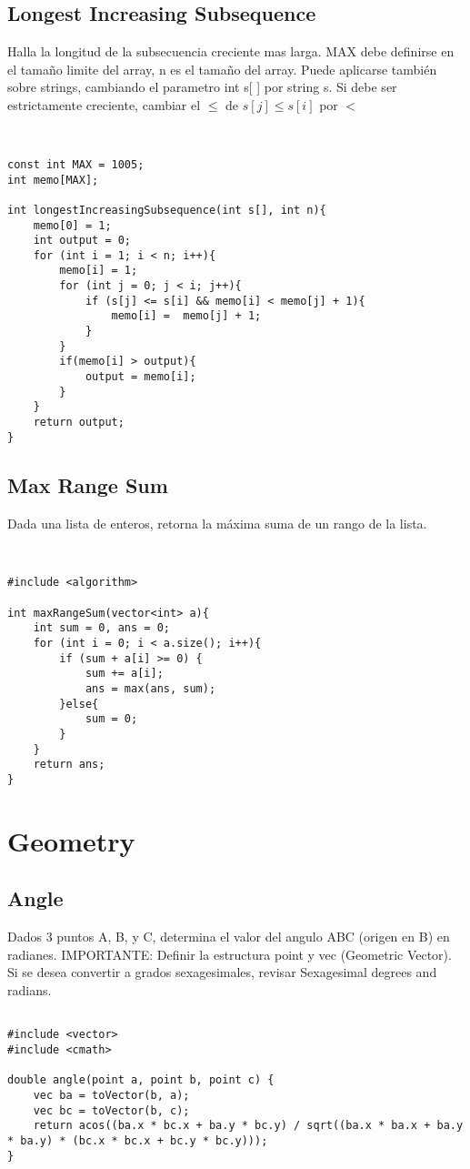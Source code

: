 \documentclass[11pt,letterpaper,twocolumn,twosided]{article}
\begin{document}
\subsection{Longest Increasing Subsequence}
Halla la longitud de la subsecuencia creciente mas larga. MAX debe definirse en el tama\~no  limite del array, n es el tama\~no del array. Puede aplicarse tambi\'en sobre strings, cambiando el parametro int s[ ] por string s. Si debe ser estrictamente creciente, cambiar el $\leq$ de $s[ j ] \leq s[i]$ por $<$
\begin{lstlisting}


const int MAX = 1005;
int memo[MAX];

int longestIncreasingSubsequence(int s[], int n){
	memo[0] = 1;
	int output = 0;
	for (int i = 1; i < n; i++){
		memo[i] = 1;
		for (int j = 0; j < i; j++){
			if (s[j] <= s[i] && memo[i] < memo[j] + 1){
				memo[i] =  memo[j] + 1;
			} 
		}
		if(memo[i] > output){
			output = memo[i];
		}
	}
	return output;
}
\end{lstlisting}

\subsection{Max Range Sum}
Dada una lista de enteros, retorna la máxima suma de un rango de la lista.
\begin{lstlisting}


#include <algorithm>

int maxRangeSum(vector<int> a){
	int sum = 0, ans = 0;
	for (int i = 0; i < a.size(); i++){
		if (sum + a[i] >= 0) {  
			sum += a[i];
		    ans = max(ans, sum);          
	    }else{
	    	sum = 0;
	    }
	}
	return ans;
}
\end{lstlisting}

\section{Geometry}

\subsection{Angle}
Dados 3 puntos A, B, y C, determina el valor del angulo ABC (origen en B) en radianes. IMPORTANTE: Definir la estructura point y vec (Geometric Vector). Si se desea convertir a grados sexagesimales, revisar Sexagesimal degrees and radians.

\begin{lstlisting}

#include <vector>
#include <cmath>

double angle(point a, point b, point c) { 
  	vec ba = toVector(b, a);
  	vec bc = toVector(b, c);
  	return acos((ba.x * bc.x + ba.y * bc.y) / sqrt((ba.x * ba.x + ba.y * ba.y) * (bc.x * bc.x + bc.y * bc.y))); 
}
\end{lstlisting}
\end{document}
